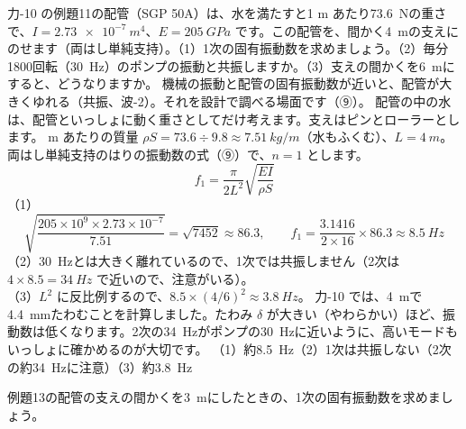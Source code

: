 \label{ph:波-6:ex13}
\begin{phreidai}[水を満たした配管のゆれ]
力-10 の例題11の配管（SGP 50A）は、水を満たすと1 m あたり\qty{73.6}{N}の重さで、$I=\qty{2.73e-7}{m^4}$、$E=\qty{205}{GPa}$ です。この配管を、間かく\qty{4}{m}の支えにのせます（両はし単純支持）。（1）1次の固有振動数を求めましょう。（2）毎分1800回転（\qty{30}{Hz}）のポンプの振動と共振しますか。（3）支えの間かくを\qty{6}{m}にすると、どうなりますか。
\phbamen
機械の振動と配管の固有振動数が近いと、配管が大きくゆれる（共振、波-2）。それを設計で調べる場面です（⑨）。
\phmushi
配管の中の水は、配管といっしょに動く重さとしてだけ考えます。支えはピンとローラーとします。
 m あたりの質量 $\rho S=73.6\div9.8\approx\qty{7.51}{kg/m}$（水もふくむ）、$L=\qty{4}{m}$。
\phriyu
両はし単純支持のはりの振動数の式（⑨）で、$n=1$ とします。
\phtateru
\[f_1=\frac{\pi}{2L^2}\sqrt{\frac{EI}{\rho S}}\]
\phtoku
（1）\[\sqrt{\frac{205\times10^9\times2.73\times10^{-7}}{7.51}}=\sqrt{7452}\approx86.3,\qquad f_1=\frac{3.1416}{2\times16}\times86.3\approx\qty{8.5}{Hz}\]
（2）\qty{30}{Hz}とは大きく離れているので、1次では共振しません（2次は $4\times8.5=\qty{34}{Hz}$ で近いので、注意がいる）。\\
（3）$L^2$ に反比例するので、$8.5\times(4/6)^2\approx\qty{3.8}{Hz}$。
\phtashikame
力-10 では、\qty{4}{m}で\qty{4.4}{mm}たわむことを計算しました。たわみ $\delta$ が大きい（やわらかい）ほど、振動数は低くなります。2次の\qty{34}{Hz}がポンプの\qty{30}{Hz}に近いように、高いモードもいっしょに確かめるのが大切です。
\kotae （1）約\qty{8.5}{Hz}（2）1次は共振しない（2次の約\qty{34}{Hz}に注意）（3）約\qty{3.8}{Hz}
\end{phreidai}
\begin{jibun}
例題13の配管の支えの間かくを\qty{3}{m}にしたときの、1次の固有振動数を求めましょう。
\end{jibun}

